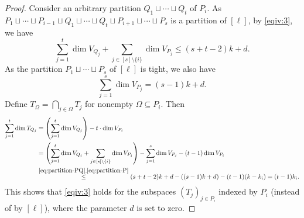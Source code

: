 \documentclass[11pt]{article}
\theoremstyle{plain}
\theoremstyle{definition}
\theoremstyle{remark}
\begin{document}
\begin{proof}
Consider an arbitrary partition $Q_1\sqcup \cdots\sqcup Q_t$ of $P_i$. As $P_1\sqcup\cdots \sqcup P_{i-1}\sqcup Q_1\sqcup \cdots \sqcup Q_t\sqcup P_{i+1}\sqcup\cdots\sqcup P_s$ is a partition of $[\ell]$, by \cref{eqiv:3}, we have
\begin{equation}\label{eq:partition-PQ}
\sum_{j=1}^t \dim V_{Q_j}+\sum_{j\in [s]\setminus \{i\}}\dim V_{P_j} \leq (s+t-2)k+d.
\end{equation}
As the partition $P_1\sqcup\cdots\sqcup P_s$ of $[\ell]$ is tight, we also have
\begin{equation}\label{eq:partition-P}
\sum_{j=1}^s\dim V_{P_j} = (s-1)k+d.
\end{equation}
Define $T_\Omega=\bigcap_{j\in\Omega} T_j$ for nonempty $\Omega\subseteq P_i$.
Then
\begin{align*}
\sum_{j=1}^t \dim T_{Q_j} &=\left(\sum_{j=1}^t \dim V_{Q_j}\right)-t\cdot \dim V_{P_i}\\
&=\left(\sum_{j=1}^t \dim V_{Q_j}+\sum_{j\in [s]\setminus \{i\}}\dim V_{P_j}\right)- \sum_{j=1}^s\dim V_{P_j}-(t-1)\dim V_{P_i}\\
&\stackrel{\eqref{eq:partition-PQ},\eqref{eq:partition-P}}{\leq} (s+t-2)k+d-((s-1)k+d)-(t-1)(k-k_i)=(t-1)k_i.
\end{align*}
This shows that \cref{eqiv:3} holds for the subspaces $(T_j)_{j\in P_i}$ indexed by $P_i$ (instead of by $[\ell]$), where the parameter $d$ is set to zero.


\end{proof}
\end{document}
